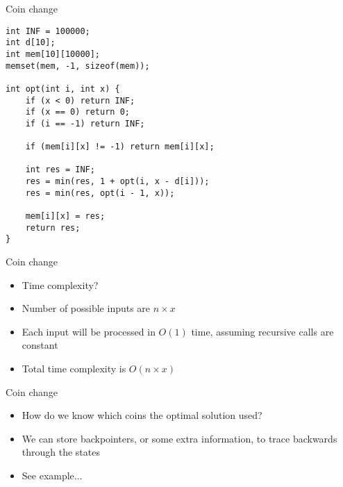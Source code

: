    \begin{frame}[fragile]{Coin change}
    \begin{lstlisting}
int INF = 100000;
int d[10];
int mem[10][10000];
memset(mem, -1, sizeof(mem));

int opt(int i, int x) {
    if (x < 0) return INF;
    if (x == 0) return 0;
    if (i == -1) return INF;

    if (mem[i][x] != -1) return mem[i][x];

    int res = INF;
    res = min(res, 1 + opt(i, x - d[i]));
    res = min(res, opt(i - 1, x));

    mem[i][x] = res;
    return res;
}
    \end{lstlisting}
\end{frame}

   \begin{frame}[fragile]{Coin change}
    \begin{itemize}
        \item Time complexity?
        \item Number of possible inputs are $n \times x$
        \item Each input will be processed in $O(1)$ time, assuming recursive calls are constant
        \item Total time complexity is $O(n\times x)$
    \end{itemize}
\end{frame}

   \begin{frame}[fragile]{Coin change}
    \begin{itemize}
        \item How do we know which coins the optimal solution used?
        \item We can store backpointers, or some extra information, to trace backwards through the states
        \item See example...
    \end{itemize}
\end{frame}

